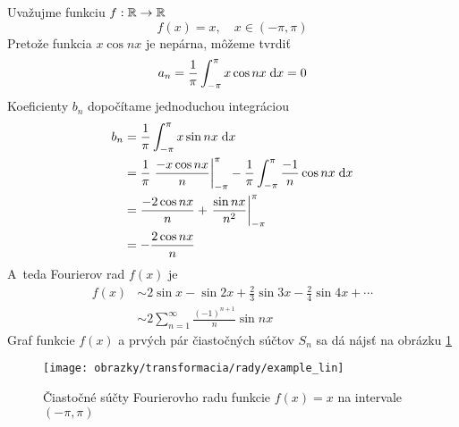 \begin{priklad}
   Uvažujme funkciu $f:{\mathbb R}\rightarrow{\mathbb R}$
   \begin{equation*}
        f(x) = x, \quad x \in(-\pi,\pi)
   \end{equation*}
%
    Pretože funkcia $x \cos nx$ je nepárna, môžeme tvrdiť
   \begin{equation*}
        a_n = \frac{1}{\pi} \int_{-\pi}^{\pi} x \cos nx \; \mathrm{d} x =0
   \end{equation*}
    Koeficienty $b_n$ dopočítame jednoduchou integráciou
   \begin{equation*}
   \begin{split}
        b_n &= \frac{1}{\pi} \int_{-\pi}^{\pi} x \sin nx \; \mathrm{d} x \\
        &= \frac{1}{\pi} \left.
            \frac{- x \cos nx}{n}
            \right|_{-\pi}^\pi -
            \frac{1}{\pi} \int_{-\pi}^{\pi} \frac{-1}{n} \cos nx \; \mathrm{d} x  \\
        &=
        \frac{-2 \cos nx}{n} + 
            \left.
                \frac{\sin nx}{n^2}
            \right|_{-\pi}^{\pi} \\
        &= -\frac{2 \cos nx}{n}
   \end{split}
   \end{equation*}
   A~teda Fourierov rad  $f(x)$ je
    \begin{equation*}
    \begin{split}
        f(x) &\sim 2 \sin x - \sin 2x + \frac{2}{3} \sin 3x - \frac{2}{4}
        \sin 4x + \cdots \\
        &\sim 2\sum_{n=1}^{\infty} \frac{(-1)^{n+1}}{n} \sin nx
    \end{split}
    \end{equation*}
    Graf funkcie $f(x)$ a prvých pár čiastočných súčtov $S_n$ sa dá
    nájsť na obrázku \ref{fig:example_lin}
    \begin{figure}[htp]
        \centering
        \texttt{[image: obrazky/transformacia/rady/example\_lin]}
        \caption{Čiastočné súčty Fourierovho radu funkcie $f(x)=x$ na
        intervale $(-\pi,\pi)$}
        \label{fig:example_lin}
    \end{figure}
    \label{priklad:fourier_series_linear}
\end{priklad}



